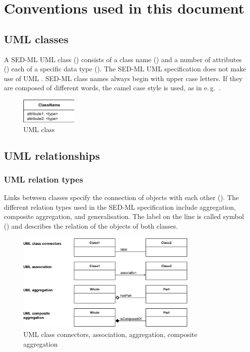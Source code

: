 \section{Conventions used in this document}
\label{sec:conventions}

\subsection{UML classes}
A SED-ML UML class () consists of a class name () and a number of attributes () each of a specific data type (). The SED-ML UML specification does not make use of UML . SED-ML class names always begin with upper case letters. If they are composed of different words, the camel case style is used, as in e.\,g.\ .
\begin{figure}[ht]
	\centering
	\includegraphics[width=0.25\textwidth]{images/uml/umlClass}
	\caption{UML class}
	\label{fig:umlClass}    
\end{figure}

\subsection{UML relationships}
\subsubsection{UML relation types}
Links between classes specify the connection of objects with each other (). The different relation types used in the SED-ML specification include aggregation, composite aggregation, and generalisation. The label on the line is called symbol () and describes the relation of the objects of both classes. 

\begin{figure}[ht]
	\centering
	\includegraphics[width=0.8\textwidth]{images/uml/umlRelationship}
	\caption{UML class connectors, association, aggregation, composite aggregation}
	\label{fig:umlRelationships}
\end{figure}

